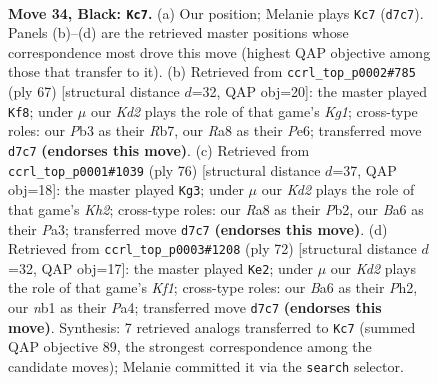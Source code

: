 \documentclass[11pt]{article}
\begin{document}
\clearpage

\begin{figure}[p]\centering
\begin{subfigure}{0.46\textwidth}\centering
\resizebox{\linewidth}{!}{%
\newchessgame
\chessboard[
  setfen={r7/3k1N2/b1p1p3/P3P2p/R4P1P/1p6/1b5K/1N6 b - - 3 34},
  showmover=false,
  pgfstyle=straightmove, color=movearrow, markmove={d7-c7}
]}
\caption{}
\end{subfigure}\hfill
\begin{subfigure}{0.46\textwidth}\centering
\resizebox{\linewidth}{!}{%
\newchessgame
\chessboard[
  setfen={6k1/1rb2p2/4pp2/P1p4p/2N5/1P3P2/5P1P/R5K1 b - - 0 34},
  showmover=false,
  pgfstyle=straightmove, color=movearrow, markmove={g8-f8}
]}
\caption{}
\end{subfigure}
\\[4pt]
\begin{subfigure}{0.46\textwidth}\centering
\resizebox{\linewidth}{!}{%
\newchessgame
\chessboard[
  setfen={6k1/1R6/4pnp1/p2p4/7P/P4B1P/1P3P1K/2r5 w - - 2 39},
  showmover=false,
  pgfstyle=straightmove, color=movearrow, markmove={h2-g3}
]}
\caption{}
\end{subfigure}\hfill
\begin{subfigure}{0.46\textwidth}\centering
\resizebox{\linewidth}{!}{%
\newchessgame
\chessboard[
  setfen={r7/3kp2p/6p1/p2Pp3/P3n3/1P6/6PP/2R1BK2 w - - 6 37},
  showmover=false,
  pgfstyle=straightmove, color=movearrow, markmove={f1-e2}
]}
\caption{}
\end{subfigure}
\caption{\textbf{Move 34, Black: \texttt{Kc7}.} (a) Our position; Melanie plays \texttt{Kc7} (\texttt{d7c7}). Panels (b)--(d) are the retrieved master positions whose correspondence most drove this move (highest QAP objective among those that transfer to it). (b) Retrieved from \texttt{ccrl\_top\_p0002\#785} (ply 67) [structural distance $d$=32, QAP obj=20]: the master played \texttt{Kf8}; under $\mu$ our \emph{Kd2} plays the role of that game's \emph{Kg1}; cross-type roles: our \emph{P}b3 as their \emph{R}b7, our \emph{R}a8 as their \emph{P}e6; transferred move \texttt{d7c7} \textbf{(endorses this move)}. (c) Retrieved from \texttt{ccrl\_top\_p0001\#1039} (ply 76) [structural distance $d$=37, QAP obj=18]: the master played \texttt{Kg3}; under $\mu$ our \emph{Kd2} plays the role of that game's \emph{Kh2}; cross-type roles: our \emph{R}a8 as their \emph{P}b2, our \emph{B}a6 as their \emph{P}a3; transferred move \texttt{d7c7} \textbf{(endorses this move)}. (d) Retrieved from \texttt{ccrl\_top\_p0003\#1208} (ply 72) [structural distance $d$=32, QAP obj=17]: the master played \texttt{Ke2}; under $\mu$ our \emph{Kd2} plays the role of that game's \emph{Kf1}; cross-type roles: our \emph{B}a6 as their \emph{P}h2, our \emph{n}b1 as their \emph{P}a4; transferred move \texttt{d7c7} \textbf{(endorses this move)}. Synthesis: 7 retrieved analogs transferred to \texttt{Kc7} (summed QAP objective 89, the strongest correspondence among the candidate moves); Melanie committed it via the \texttt{search} selector.}
\label{fig:thought-m67}
\end{figure}
\end{document}
